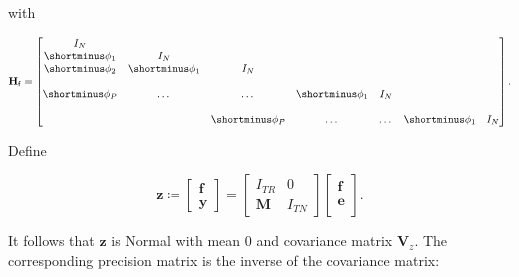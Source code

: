\documentclass[notitlepage,a4paper,12pt]{article}
\begin{document}
with 

$$
\mathbf{H}_{\sf{f}}
=
\begin{bmatrix}
    I_N &  \\
    \shortminus \phi_1 & I_N &  \\
    \shortminus \phi_2 & \shortminus \phi_1 & I_N &  \\
     &  &  &  &  & \\
    \shortminus \phi_P & \dots & \dots & \shortminus \phi_1 & I_N \\
     &  &  &  &  & \\
    & & \shortminus \phi_P & \dots & \dots & \shortminus \phi_1 & I_N
\end{bmatrix}.
$$

Define 

\begin{equation}
    \mathbf{z} 
    \coloneqq 
    \begin{bmatrix}
        \mathbf{f} \\
        \mathbf{y}
    \end{bmatrix} 
    = 
    \begin{bmatrix}
        I_{TR} & 0 \\
        \mathbf{M} & I_{TN} 
    \end{bmatrix}
    \begin{bmatrix}
        \mathbf{f}\\
        \mathbf{e}\\
    \end{bmatrix}.
\end{equation}

It follows that $\mathbf{z}$ is Normal with mean 0 and covariance matrix $\mathbf{V}_{\!z}$. The corresponding precision matrix is the inverse of the covariance matrix: 
\end{document}
